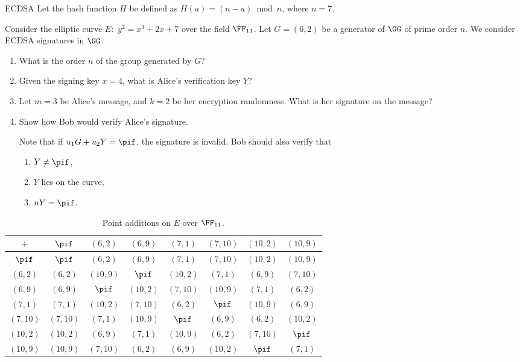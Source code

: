 \documentclass{practice}
\begin{document}
\newpage

\begin{task}{ECDSA}
  Let the hash function $H$ be defined as $H(a) = (n - a) \bmod{n}$, where $n = 7$.

  Consider the elliptic curve $E:$ $y^2 = x^3 + 2x + 7$ over the field $\FF_{11}$.
  Let $G = (6, 2)$ be a generator of $\GG$ of prime order $n$.
  We consider ECDSA signatures in $\GG$.
  \begin{enumerate}
    \item What is the order $n$ of the group generated by $G$? %
    \item Given the signing key $x = 4$, what is Alice's verification key $Y$?
    \item Let $m = 3$ be Alice's message, and $k = 2$ be her encryption randomness.
    What is her signature on the message?
    \item Show how Bob would verify Alice's signature.

    Note that if $u_1G + u_2Y = \pif$, the signature is invalid.
    Bob should also verify that
    \begin{enumerate}
      \item $Y \neq \pif$,
      \item $Y$ lies on the curve,
      \item $nY = \pif$.
    \end{enumerate}
  \end{enumerate}

  \begin{table}[h]
    \centering
    \begin{tabular}{c|ccccccc}
      \toprule
      $+$      & $\pif$   & $(6,2)$  & $(6,9)$  & $(7,1)$  & $(7,10)$ & $(10,2)$ & $(10,9)$\\\midrule
      $\pif$   & $\pif$   & $(6,2)$  & $(6,9)$  & $(7,1)$  & $(7,10)$ & $(10,2)$ & $(10,9)$\\
      $(6,2)$  & $(6,2)$  & $(10,9)$ & $\pif$   & $(10,2)$ & $(7,1)$  & $(6,9)$  & $(7,10)$\\
      $(6,9)$  & $(6,9)$  & $\pif$   & $(10,2)$ & $(7,10)$ & $(10,9)$ & $(7,1)$  & $(6,2)$\\
      $(7,1)$  & $(7,1)$  & $(10,2)$ & $(7,10)$ & $(6,2)$  & $\pif$   & $(10,9)$ & $(6,9)$\\
      $(7,10)$ & $(7,10)$ & $(7,1)$  & $(10,9)$ & $\pif$   & $(6,9)$  & $(6,2)$  & $(10,2)$\\
      $(10,2)$ & $(10,2)$ & $(6,9)$  & $(7,1)$  & $(10,9)$ & $(6,2)$  & $(7,10)$ & $\pif$\\
      $(10,9)$ & $(10,9)$ & $(7,10)$ & $(6,2)$  & $(6,9)$  & $(10,2)$ & $\pif$   & $(7,1)$\\\bottomrule
    \end{tabular}
    \caption{Point additions on $E$ over $\FF_{11}$.}
  \end{table}
\end{task}
\end{document}
